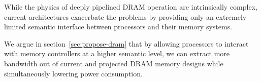 While the physics of deeply pipelined DRAM operation are intrinsically
complex, current architectures exacerbate the problems by providing
only an extremely limited semantic interface between processors and
their memory systems.

We argue in section~\ref{sec:propose-dram} that by allowing processors to 
interact with memory controllers at a higher semantic level, we can extract more 
bandwidth out of current and projected DRAM memory designs while 
simultaneously lowering power consumption.   



\begin{comment}
Unpublished
experiments at TACC with the DRAMSIM2 simulation
framework~\cite{DRAMSim2} show that with the resulting optimal
scheduling, a DDR3/1600 DRAM channel can easily deliver 95\% of its
peak bandwidth (over 97\% of the non-refresh cycles) for the STREAM
benchmark kernels at a power efficiency of approximately 20 mW/Gbs.
This power efficiency value is 3-5$\times$ better than the assumptions of most
exascale studies, because we assume that with architectural extensions
open page mode can continue to be effectively exploited, while the
more common assumption is that the massive multi-threading assumed to
be required to tolerate latency will destroy any hope of page-level
locality exploitation at the DRAMs.  
\end{comment}




